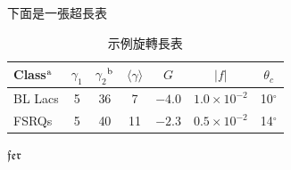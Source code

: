下面是一張超長表
\begin{table}
	
	\caption{示例旋轉長表} 
	\centering
	\setlength{\tabcolsep}{10mm}
	\begin{tabular}[l]{@{}lcccccc}		
	\toprule		
	Class$^{\rm a}$ & $\gamma_1$ & $\gamma_2$$^{\rm b}$& $\langle \gamma \rangle$& $G$ & $|{ f}|$ & $\theta _{c}$ \\		
	\midrule	
	BL Lacs &5 & 36 & 7 & $-4.0$ & $1.0\times 10^{-2}$ & 10$^\circ$ \\		
	FSRQs & 5 & 40 & 11 & $-2.3$ & $0.5\times 10^{-2}$ & 14$^\circ$ \\		
	\bottomrule		
\end{tabular}
\end{table}


$\mathfrak{fer}$














